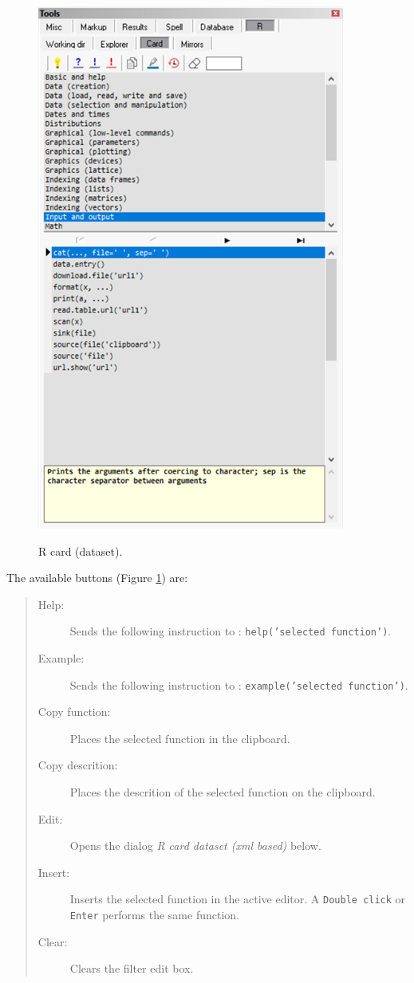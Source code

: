 \begin{figure}[H]
  \includegraphics[scale=0.35]{./res/tools_r_card.png}\\
  \caption{R card (dataset).}
  \label{fig:tools_r_card}
\end{figure}

The available buttons
(Figure \ref{fig:tools_r_card})
are:

\begin{quote}
  \begin{footnotesize}
    \begin{description}
      \item[Help:]
        Sends the following instruction to \RR{}: \texttt{help('selected function')}.
      \item[Example:]
        Sends the following instruction to \RR{}: \texttt{example('selected function')}.
      \item[Copy function:]
        Places the selected function in the clipboard.
      \item[Copy descrition:]
        Places the descrition of the selected function on the clipboard.
      \item[Edit:]
        Opens the dialog \textit{R card dataset (xml based)} below.
      \item[Insert:]
        Inserts the selected function in the active editor. A
        \texttt{Double click} or \texttt{Enter} performs the same function.
      \item [Clear:]
        Clears the filter edit box.
    \end{description}
  \end{footnotesize}
\end{quote}

